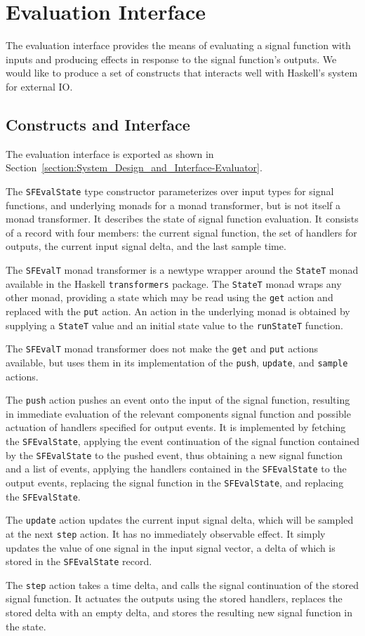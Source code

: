 \section{Evaluation Interface}
\label{section:Implementation-Evaluation_Interface}
The evaluation interface provides the means of evaluating a signal function
with inputs and producing effects in response to the signal function's outputs.
We would like to produce a set of constructs that interacts well with Haskell's
system for external IO.

\subsection{Constructs and Interface}
\label{section:Implementation-Evaluation_Interface-Constructs_and_Interface}

The evaluation interface is exported as shown in
Section~\ref{section:System_Design_and_Interface-Evaluator}.

The {\tt SFEvalState} type constructor parameterizes over input types for signal
functions, and underlying monads for a monad transformer, but is not itself
a monad transformer. It describes the state of signal function evaluation.
It consists of a record with four members: the current signal function,
the set of handlers for outputs, the current input signal delta, and the last
sample time.

The {\tt SFEvalT} monad transformer is a newtype wrapper around the {\tt StateT}
monad available in the Haskell {\tt transformers} package. The {\tt StateT} monad
wraps any other monad, providing a state which may be read using the {\tt get}
action and replaced with the {\tt put} action. An action in the underlying
monad is obtained by supplying a {\tt StateT} value and an initial state
value to the {\tt runStateT} function.

The {\tt SFEvalT} monad transformer does not make the {\tt get} and {\tt put}
actions available, but uses them in its implementation of the {\tt push},
{\tt update}, and {\tt sample} actions.

The {\tt push} action pushes an event onto the input of the signal function,
resulting in immediate evaluation of the relevant components signal function
and possible actuation of handlers specified for output events. It is
implemented by fetching the {\tt SFEvalState}, applying the event continuation
of the signal function contained by the {\tt SFEvalState} to the pushed event,
thus obtaining a new signal function and a list of events, applying the handlers
contained in the {\tt SFEvalState} to the output events, replacing the signal
function in the {\tt SFEvalState}, and replacing the {\tt SFEvalState}.

The {\tt update} action updates the current input signal delta, which will be
sampled at the next {\tt step} action. It has no immediately observable effect.
It simply updates the value of one signal in the input signal vector, a delta
of which is stored in the {\tt SFEvalState} record.

The {\tt step} action takes a time delta, and calls the signal continuation of
the stored signal function. It actuates the outputs using the stored handlers,
replaces the stored delta with an empty delta, and stores the resulting new
signal function in the state.

